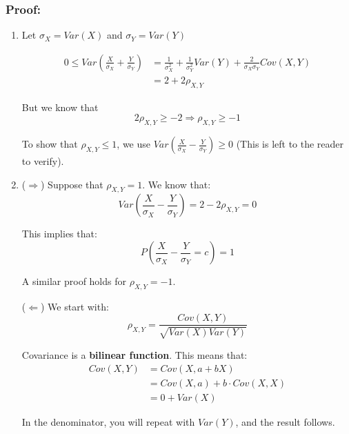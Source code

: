 \documentclass{article}
\begin{document}
\subsubsection*{Proof:}
\begin{enumerate}
    \item Let $\sigma_X = Var(X)$ and $\sigma_Y= Var(Y)$ 
    
    \begin{equation*}
        \begin{split}
            0 \leq Var\left(\frac{X}{\sigma_X} + \frac{Y}{\sigma_Y} \right) &= \frac{1}{\sigma_X^2} + \frac{1}{\sigma_Y^2} Var(Y) + \frac{2}{\sigma_X \sigma_Y} Cov(X,Y)\\
            &= 2 + 2 \rho_{X,Y}
        \end{split}
    \end{equation*}
    
    But we know that
    \begin{equation*}
        2\rho_{X,Y} \geq -2 \Rightarrow \rho_{X,Y} \geq -1
    \end{equation*}
    
    To show that $\rho_{X,Y} \leq 1$, we use $Var\left(\frac{X}{\sigma_X}-\frac{Y}{\sigma_Y} \right) \geq 0$ (This is left to the reader to verify).
    
    \item ($\Rightarrow$) Suppose that $\rho_{X,Y} = 1$. We know that:
    \begin{equation*}
        Var\left(\frac{X}{\sigma_X} - \frac{Y}{\sigma_Y} \right) = 2 - 2 \rho_{X,Y} = 0
    \end{equation*}
    
    This implies that:
    \begin{equation*}
        P\left(\frac{X}{\sigma_X} - \frac{Y}{\sigma_Y} = c \right) = 1
    \end{equation*}
    
    A similar proof holds for $\rho_{X,Y} = -1$.
    
    ($\Leftarrow$) We start with:
    \begin{equation*}
        \rho_{X,Y} = \frac{Cov(X,Y)}{\sqrt{Var(X)Var(Y)}}
    \end{equation*}
    
    Covariance is a \textbf{bilinear function}. This means that:
    \begin{equation*}
        \begin{split}
            Cov(X,Y) &= Cov(X,a+bX)\\
                &= Cov(X,a) + b\cdot Cov(X,X)\\
                &= 0 + Var(X)
        \end{split}
    \end{equation*}
    
    In the denominator, you will repeat with $Var(Y)$, and the result follows.
\end{enumerate}
\end{document}
